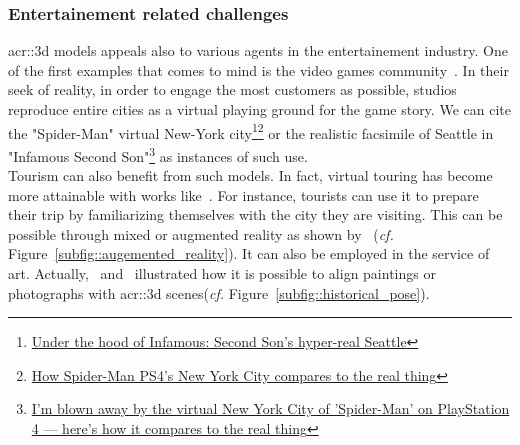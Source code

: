         \subsubsection{Entertainement related challenges}
            \gls{acr::3d} models appeals also to various agents in the entertainement industry.
            One of the first examples that comes to mind is the video games community~\parencite{watson2008procedural}.
            In their seek of reality, in order to engage the most customers as possible, studios reproduce entire cities as a virtual playing ground for the game story.
            We can cite the "Spider-Man" virtual New-York city\footnote{
                \href{https://www.polygon.com/2013/9/25/4702318/under-the-hood-of-infamous-second-son-hyper-real-seattle}{Under the hood of Infamous: Second Son's hyper-real Seattle}
            }\footnote{
                \href{https://www.polygon.com/e3/2018/6/12/17453588/spider-man-ps4-new-york-city-avengers-demo-preview}{How Spider-Man PS4’s New York City compares to the real thing}
            } or the realistic facsimile of Seattle in "Infamous Second Son"\footnote{
                \href{http://www.businessinsider.fr/us/spider-man-ps4-new-york-city-2018-9}{I'm blown away by the virtual New York City of 'Spider-Man' on PlayStation 4 — here's how it compares to the real thing}
            } as instances of such use.\\
            Tourism can also benefit from such models.
            In fact, virtual touring has become more attainable with works like~\textcite{koutsoudis20073d}.
            For instance, tourists can use it to prepare their trip by familiarizing themselves with the city they are visiting.
            This can be possible through mixed or augmented reality as shown by~\textcite{devaux20183d} (\textit{cf.} Figure~\ref{subfig::augemented_reality}).
            It can also be employed in the service of art.
            Actually,~\textcite{aubry2014painting} and~\textcite{russell2011automatic} illustrated how it is possible to align paintings or photographs with \gls{acr::3d} scenes(\textit{cf.} Figure~\ref{subfig::historical_pose}).\\
